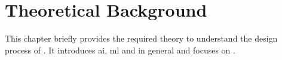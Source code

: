 \chapter{Theoretical Background}
\label{ch:theoretical_background}

This chapter briefly provides the required theory to understand the design process of .
It introduces \acrfull{ai}, \acrfull{ml} and  in general and focuses on .





